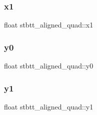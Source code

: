 \subsubsection{\texorpdfstring{x1}{x1}}
{\footnotesize\ttfamily float stbtt\+\_\+aligned\+\_\+quad\+::x1}

\hypertarget{structstbtt__aligned__quad_a6178a6b380cf6889893afaeb5019ecd6}{}\label{structstbtt__aligned__quad_a6178a6b380cf6889893afaeb5019ecd6} 
\subsubsection{\texorpdfstring{y0}{y0}}
{\footnotesize\ttfamily float stbtt\+\_\+aligned\+\_\+quad\+::y0}

\hypertarget{structstbtt__aligned__quad_a66ee8061da982804073a3d2a9114e53c}{}\label{structstbtt__aligned__quad_a66ee8061da982804073a3d2a9114e53c} 
\subsubsection{\texorpdfstring{y1}{y1}}
{\footnotesize\ttfamily float stbtt\+\_\+aligned\+\_\+quad\+::y1}

